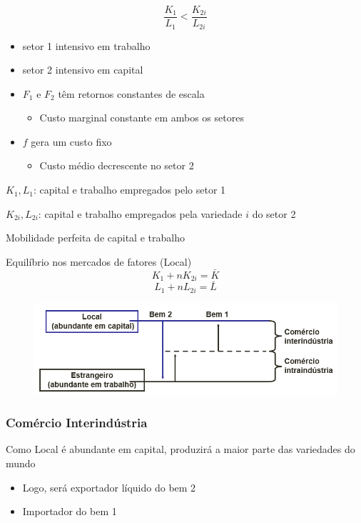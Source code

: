 \documentclass[a4paper,12pt]{article}[abntex2]
\begin{document}
\[
\frac{K_1}{L_1} < \frac{K_{2i}}{L_{2i}}
\]
\begin{itemize}
  \item setor 1 intensivo em trabalho
  \item setor 2 intensivo em capital
\end{itemize}

\begin{itemize}
  \item $F_1$ e $F_2$ têm retornos constantes de escala
  \begin{itemize}
    \item Custo marginal constante em ambos os setores
  \end{itemize}
  \item $f$ gera um custo fixo
  \begin{itemize}
    \item Custo médio decrescente no setor 2
  \end{itemize}
\end{itemize}

$K_1, L_1$: capital e trabalho empregados pelo setor 1

$K_{2i}, L_{2i}$: capital e trabalho empregados pela variedade $i$ do setor 2

Mobilidade perfeita de capital e trabalho

Equilíbrio nos mercados de fatores (Local)
\[
K_1 + nK_{2i} = \bar{K}
\]
\[
L_1 + nL_{2i} = \bar{L}
\]

\begin{figure}[H]
    \centering
    \includegraphics[width=0.7\linewidth]{Imagens/a17i2.png}
\end{figure}

\subsubsection{\textbf{Comércio Interindústria}}
Como Local é abundante em capital, produzirá a maior parte das variedades do mundo
\begin{itemize}
  \item Logo, será exportador líquido do bem 2
  \item Importador do bem 1
\end{itemize}
\end{document}
